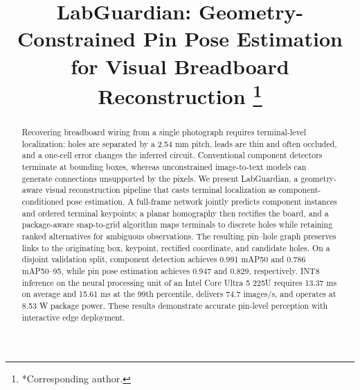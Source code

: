 \documentclass[conference]{IEEEtran}
\begin{document}
\title{LabGuardian: Geometry-Constrained Pin Pose Estimation for Visual
Breadboard Reconstruction
\thanks{*Corresponding author.}}

\author{
\and
{}
\and
{}
}

\maketitle

\begin{abstract}
Recovering breadboard wiring from a single photograph requires terminal-level
localization: holes are separated by a 2.54 mm pitch, leads are thin and often
occluded, and a one-cell error changes the inferred circuit. Conventional
component detectors terminate at bounding boxes, whereas unconstrained
image-to-text models can generate connections unsupported by the pixels. We
present LabGuardian, a geometry-aware visual reconstruction pipeline that casts
terminal localization as component-conditioned pose estimation. A full-frame
network jointly predicts component instances and ordered terminal keypoints; a
planar homography then rectifies the board, and a package-aware snap-to-grid
algorithm maps terminals to discrete holes while retaining ranked alternatives
for ambiguous observations. The resulting pin--hole graph preserves links to
the originating box, keypoint, rectified coordinate, and candidate holes. On a
disjoint validation split, component detection achieves 0.991 mAP50 and 0.786
mAP50--95, while pin pose estimation achieves 0.947 and 0.829, respectively.
INT8 inference on the neural processing unit of an Intel Core Ultra 5 225U
requires 13.37 ms on average and 15.61 ms at the 99th percentile, delivers 74.7
images/s, and operates at 8.53 W package power. These results demonstrate
accurate pin-level perception with interactive edge deployment.
\end{abstract}
\end{document}
